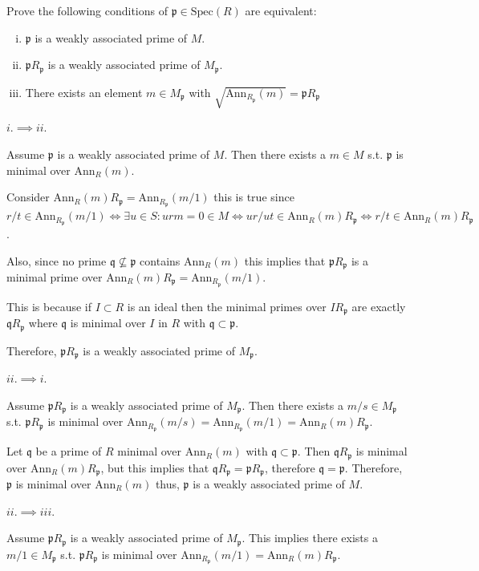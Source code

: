 \documentclass[12pt, letterpaper]{article}
\newcommand{\p}{\mathfrak{p}}
\newcommand{\Spec}{\mathrm{Spec}}
\newcommand{\Ann}{\mathrm{Ann}}
\newcommand{\mf}[1]{\mathfrak{#1}}
\begin{document}
\begin{subproblem}{}
    Prove the following conditions of $\p \in \Spec(R)$ are equivalent:
    \begin{enumerate}[i.]
        \item $\p$ is a weakly associated prime of $M$.
        \item $\p R_\p$ is a weakly associated prime of $M_\p$.
        \item There exists an element $m \in M_\p$ with $\sqrt{\Ann_{R_\p}(m)}=\p R_\p$
    \end{enumerate}
\end{subproblem}
\begin{problemproof}
    $i. \implies ii.$

    Assume $\p$ is a weakly associated prime of $M$. Then there exists a $m \in M$ s.t. $\p$ is minimal over $\Ann_R(m)$.

    Consider $\Ann_R(m) R_\p = \Ann_{R_\p}(m/1)$ this is true since $r/t \in \Ann_{R_\p}(m/1) \iff \exists u \in S : urm = 0 \in M \iff ur/ut \in \Ann_R(m) R_\p \iff r/t \in \Ann_R(m) R_\p$.

    Also, since no prime $\mf{q} \nsubseteq \p$ contains  $\Ann_R(m)$ this implies that $\p R_\p$ is a minimal prime over $\Ann_R(m) R_\p = \Ann_{R_\p}(m/1)$. 
    
    This is because if $I \subset R$ is an ideal then the minimal primes over $I R_\p$ are exactly $\mf{q} R_\p$ where $\mf{q}$ is minimal over $I$ in $R$ with $\mf{q} \subset \p$.
    
    Therefore, $\p R_\p$ is a weakly associated prime of $M_\p$.

    $ii. \implies i.$

    Assume $\p R_\p$ is a weakly associated prime of $M_\p$. Then there exists a $m/s \in M_\p$ s.t. $\p R_\p$ is minimal over $\Ann_{R_\p}(m/s)=\Ann_{R_\p}(m/1) = \Ann_R(m) R_\p$.

    Let $\mf{q}$ be a prime of $R$ minimal over $\Ann_R(m)$ with $\mf{q} \subset \p$. Then $\mf{q} R_\p$ is minimal over $\Ann_R(m) R_\p$, but this implies that $\mf{q} R_\p = \p R_\p$, therefore $\mf{q} = \p$. Therefore, $\p$ is minimal over
    $\Ann_R(m)$ thus, $\p$ is a weakly associated prime of $M$.


    $ii. \implies iii.$

    Assume $\p R_\p$ is a weakly associated prime of $M_\p$. This implies there exists a $m/1 \in M_\p$ s.t. $\p R_\p$ is minimal over $\Ann_{R_\p}(m/1) = \Ann_R(m) R_\p$.


\end{problemproof}
\end{document}
